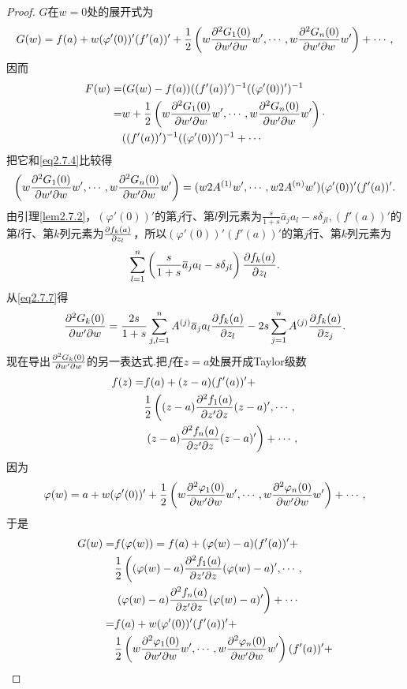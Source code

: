 \begin{proof}
	$G$在$w=0$处的展开式为
	\begin{equation}\label{eq2.7.6}
		G(w)=f(a)+w(\varphi'(0))'(f'(a))'+\frac12\left(w\frac{\partial^2 G_1(0)}{\partial w'\partial w}w',\cdots,w\frac{\partial^2 G_n(0)}{\partial w'\partial w}w'\right)+\cdots,
	\end{equation}
因而
\begin{align*}
	F(w)=
	&(G(w)-f(a))((f'(a))')^{-1}((\varphi'(0))')^{-1}\\
	=&w+\frac12\left(w\frac{\partial^2 G_1(0)}{\partial w'\partial w}w',\cdots,w\frac{\partial^2 G_n(0)}{\partial w'\partial w}w'\right)\cdot\\
	&((f'(a))')^{-1}((\varphi'(0))')^{-1}+\cdots
\end{align*}
把它和\eqref{eq2.7.4}比较得
\begin{equation}\label{eq2.7.7}
	\left(w\frac{\partial^2 G_1(0)}{\partial w'\partial w}w',\cdots,w\frac{\partial^2 G_n(0)}{\partial w'\partial w}w'\right)
	=(w2A^{(1)}w',\cdots,w2A^{(n)}w')(\varphi'(0))'(f'(a))'.
\end{equation}
由引理\ref{lem2.7.2}，$(\varphi'(0))'$的第$j$行、第$l$列元素为$\frac{s}{1+s}\bar{a}_j a_l-s\delta_{jl},(f'(a))'$的第$l$行、第$k$列元素为$\frac{\partial f_k(a)}{\partial z_l}$，所以$(\varphi'(0))'(f'(a))'$的第$j$行、第$k$列元素为
\[\sum_{l=1}^{n}\left(\frac{s}{1+s}{}\mkern1mu\overline{\mkern-1mua}_j a_l-s\delta_{jl}\right)\frac{\partial f_k(a)}{\partial z_l}.\]
从\eqref{eq2.7.7}得
\begin{equation}\label{eq2.7.8}
	\frac{\partial^2 G_k(0)}{\partial w'\partial w}=\frac{2s}{1+s}\sum_{j,l=1}^{n}A^{(j)}{}\mkern1mu\overline{\mkern-1mua}_j a_l\frac{\partial f_k(a)}{\partial z_l}-2s\sum_{j=1}^{n}A^{(j)}\frac{\partial f_k(a)}{\partial z_j}.
\end{equation}
现在导出$\frac{\partial^2 G_k(0)}{\partial w'\partial w}$的另一表达式.把$f$在$z=a$处展开成Taylor级数
\begin{align*}
	f(z)
	=&f(a)+(z-a)(f'(a))'+\\
	&\frac12\left((z-a)\frac{\partial^2 f_1(a)}{\partial z'\partial z}(z-a)',\cdots,\right.\\
	&\left. (z-a)\frac{\partial^2 f_n(a)}{\partial z'\partial z}(z-a)'\right)+\cdots,
\end{align*}
因为
\[\varphi(w)
=a+w(\varphi'(0))'+\frac12\left(w\frac{\partial^2 \varphi_1(0)}{\partial w'\partial w}w',\cdots,w\frac{\partial^2 \varphi_n(0)}{\partial w'\partial w}w'\right)+\cdots,\]
于是
\begin{align*}
	G(w)=
	&f(\varphi(w))=f(a)+(\varphi(w)-a)(f'(a))'+\\
	&\frac12\left((\varphi(w)-a)\pppp{f_1(a)}{z'}{z}(\varphi(w)-a)',\cdots,\right.\\
	&\left.(\varphi(w)-a)\pppp{f_n(a)}{z'}{z}(\varphi(w)-a)'\right)+\cdots\\
	=&f(a)+w(\varphi'(0))'(f'(a))'+\\
	&\frac12\left(w\pppp{\varphi_1(0)}{w'}{w}w',\cdots,w\pppp{\varphi_n(0)}{w'}{w}w'\right)(f'(a))'+\\

\end{align*}
\end{proof}
